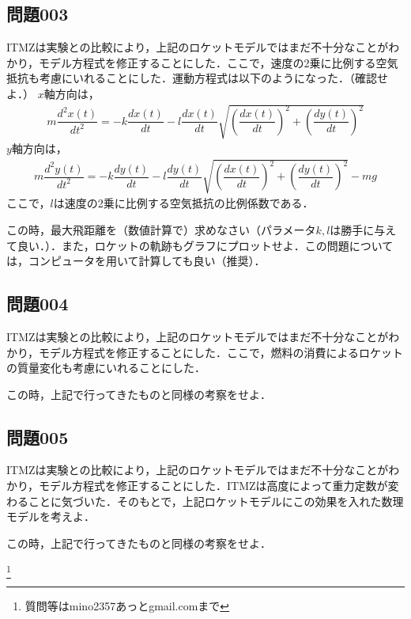 \documentclass[12pt]{jarticle}
\begin{document}
\subsection*{問題003}
ITMZは実験との比較により，上記のロケットモデルではまだ不十分なことがわかり，モデル方程式を修正することにした．ここで，速度の2乗に比例する空気抵抗も考慮にいれることにした．運動方程式は以下のようになった．（確認せよ．）
$x$軸方向は，
\begin{align*}
m \dfrac{d^2 x(t)}{dt^2} = - k \dfrac{dx(t)}{dt} - l \dfrac{dx(t)}{dt} \sqrt{ \left( \dfrac{dx(t)}{dt} \right)^2 + \left( \dfrac{dy(t)}{dt} \right)^2 } 
\end{align*}
$y$軸方向は，
\begin{align*}
m \dfrac{d^2 y(t)}{dt^2} = - k \dfrac{dy(t)}{dt} -  l \dfrac{dy(t)}{dt} \sqrt{ \left( \dfrac{dx(t)}{dt} \right)^2 + \left( \dfrac{dy(t)}{dt} \right)^2 } - mg
\end{align*}
ここで，$l$は速度の2乗に比例する空気抵抗の比例係数である．

この時，最大飛距離を（数値計算で）求めなさい（パラメータ$k, l$は勝手に与えて良い．）．また，ロケットの軌跡もグラフにプロットせよ．この問題については，コンピュータを用いて計算しても良い（推奨）．
%
\subsection*{問題004}
ITMZは実験との比較により，上記のロケットモデルではまだ不十分なことがわかり，モデル方程式を修正することにした．ここで，燃料の消費によるロケットの質量変化も考慮にいれることにした．

この時，上記で行ってきたものと同様の考察をせよ．
%
\subsection*{問題005}
ITMZは実験との比較により，上記のロケットモデルではまだ不十分なことがわかり，モデル方程式を修正することにした．ITMZは高度によって重力定数が変わることに気づいた．そのもとで，上記ロケットモデルにこの効果を入れた数理モデルを考えよ．

この時，上記で行ってきたものと同様の考察をせよ．


\footnote[0]{
質問等はmino2357あっとgmail.comまで
}

\thispagestyle{empty}
\end{document}
